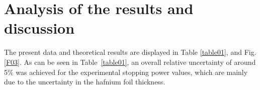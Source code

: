 \documentclass[aps,pra,reprint,groupedaddress]{revtex4-1}
\begin{document}
\section{Analysis of the results and discussion}
\label{discussion}

The present data and theoretical results are displayed in Table \ref{table01}, and Fig. \ref{F03}. As can be seen in Table~\ref{table01}, an overall relative uncertainty of around 5$\%$ was achieved for the experimental stopping power values, which are mainly due to the uncertainty in the hafnium foil thickness. %
\end{document}
